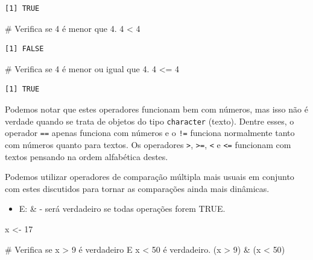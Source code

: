 \documentclass[
  letterpaper,
  DIV=11,
  numbers=noendperiod]{scrreprt}
\newenvironment{Shaded}{\begin{snugshade}}{\end{snugshade}}
\newcommand{\CommentTok}[1]{\textcolor[rgb]{0.37,0.37,0.37}{#1}}
\newcommand{\DecValTok}[1]{\textcolor[rgb]{0.68,0.00,0.00}{#1}}
\newcommand{\NormalTok}[1]{\textcolor[rgb]{0.00,0.23,0.31}{#1}}
\newcommand{\OtherTok}[1]{\textcolor[rgb]{0.00,0.23,0.31}{#1}}
\newcommand{\SpecialCharTok}[1]{\textcolor[rgb]{0.37,0.37,0.37}{#1}}
\providecommand{\tightlist}{%
  \setlength{\itemsep}{0pt}\setlength{\parskip}{0pt}}\usepackage{longtable,booktabs,array}
\begin{document}
\begin{verbatim}
[1] TRUE
\end{verbatim}

\begin{Shaded}
\begin{Highlighting}[]
\CommentTok{\# Verifica se 4 é menor que 4.}
\DecValTok{4} \SpecialCharTok{\textless{}} \DecValTok{4}
\end{Highlighting}
\end{Shaded}

\begin{verbatim}
[1] FALSE
\end{verbatim}

\begin{Shaded}
\begin{Highlighting}[]
\CommentTok{\# Verifica se 4 é menor ou igual que 4.}
\DecValTok{4} \SpecialCharTok{\textless{}=} \DecValTok{4}
\end{Highlighting}
\end{Shaded}

\begin{verbatim}
[1] TRUE
\end{verbatim}

Podemos notar que estes operadores funcionam bem com números, mas isso
não é verdade quando se trata de objetos do tipo \texttt{character}
(texto). Dentre esses, o operador \texttt{==} apenas funciona com
números e o \texttt{!=} funciona normalmente tanto com números quanto
para textos. Os operadores \texttt{\textgreater{}},
\texttt{\textgreater{}=}, \texttt{\textless{}} e \texttt{\textless{}=}
funcionam com textos pensando na ordem alfabética destes.

Podemos utilizar operadores de comparação múltipla mais usuais em
conjunto com estes discutidos para tornar as comparações ainda mais
dinâmicas.

\begin{itemize}
\tightlist
\item
  E: \& - será verdadeiro se todas operações forem TRUE.
\end{itemize}

\begin{Shaded}
\begin{Highlighting}[]
\NormalTok{x }\OtherTok{\textless{}{-}} \DecValTok{17}

\CommentTok{\# Verifica se x \textgreater{} 9 é verdadeiro E x \textless{} 50 é verdadeiro.}
\NormalTok{(x }\SpecialCharTok{\textgreater{}} \DecValTok{9}\NormalTok{) }\SpecialCharTok{\&}\NormalTok{ (x }\SpecialCharTok{\textless{}} \DecValTok{50}\NormalTok{)}
\end{Highlighting}
\end{Shaded}
\end{document}
